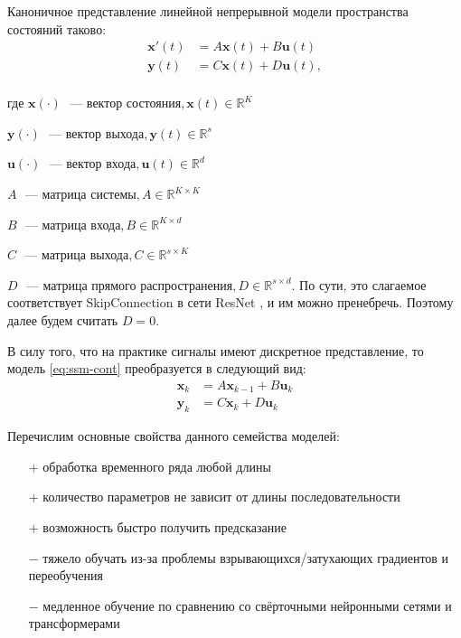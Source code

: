 \documentclass[a4paper, 12pt]{article}
\newcommand{\bx}{\mathbf{x}}
\newcommand{\by}{\mathbf{y}}
\newcommand{\bu}{\mathbf{u}}
\newcommand{\dR}{\mathds{R}}
\begin{document}
	Каноничное представление линейной непрерывной модели пространства состояний таково:
	\begin{equation}\label{eq:ssm-cont}
		\begin{aligned}
			\bx'(t) &= A\bx(t) + B\bu(t) \\
			\by(t) &= C\bx(t) + D\bu(t), \\
		\end{aligned}
	\end{equation}

	где 
	$\bx(\cdot) \text{ ~--- вектор состояния}, \bx(t) \in \dR^K$
	
	$\by(\cdot) \text{ ~--- вектор выхода}, \by(t) \in \dR^s$
	
	$\bu(\cdot) \text{ ~--- вектор входа}, \bu(t) \in \dR^d$
	
	$A \text{ ~--- матрица системы}, A \in \dR^{K \times K}$
	
	$B \text{ ~--- матрица входа}, B \in \dR^{K \times d}$
	
	$C \text{ ~--- матрица выхода}, C \in \dR^{s \times K}$
	
	$D \text{ ~--- матрица прямого распространения}, D \in \dR^{s \times d}$. По сути, это слагаемое соответствует SkipConnection в сети ResNet \citep{temp_he2016deep}, и им можно пренебречь. Поэтому далее будем считать $D = 0$.
	
	В силу того, что на практике сигналы имеют дискретное представление, то модель \ref{eq:ssm-cont} преобразуется в следующий вид:
	\begin{equation}\label{eq:ssm-discr}
		\begin{aligned}
			\bx_k &= A\bx_{k-1} + B\bu_k \\
			\by_k &= C\bx_k + D\bu_k
		\end{aligned}
	\end{equation}

	Перечислим основные свойства данного семейства моделей:
	\begin{enumerate}
		\item[$+$] обработка временного ряда любой длины
		\item[$+$] количество параметров не зависит от длины последовательности
		\item[$+$] возможность быстро получить предсказание
		\item[$-$] тяжело обучать из-за проблемы взрывающихся/затухающих градиентов и переобучения
		\item[$-$] медленное обучение по сравнению со свёрточными нейронными сетями и трансформерами
	\end{enumerate}
\end{document}
